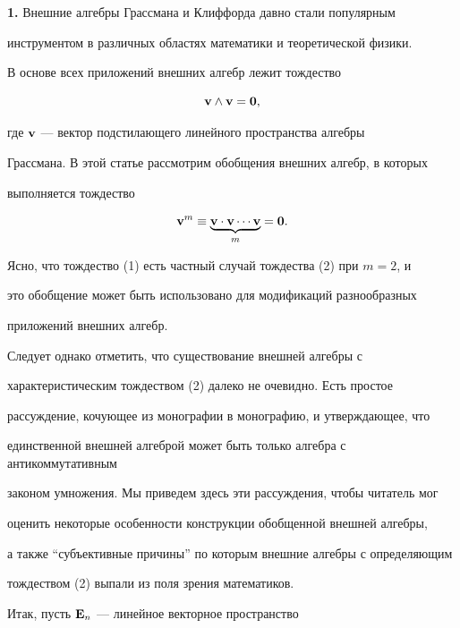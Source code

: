 {\bf 1.} Внешние алгебры Грассмана и Клиффорда давно стали  популярным


инструментом в различных областях математики и теоретической физики.


В основе всех приложений внешних алгебр лежит тождество


\begin{equation}


\bold v \land {\bold v} = {\bold 0},


\end{equation}


где ${\bold v}$ --- вектор подстилающего линейного пространства алгебры


Грассмана. В этой статье рассмотрим обобщения внешних алгебр, в которых


выполняется тождество


\begin{equation}


{\bold v}^m \equiv  \underbrace{ {\bold v \cdot\bold v \dotsb\bold v}}_{m}


= {\bold 0}.


\end{equation}


Ясно, что тождество (1) есть частный случай тождества (2) при $m=2$, и


это обобщение может быть использовано для модификаций разнообразных


приложений внешних алгебр.





Следует однако отметить, что существование внешней алгебры с


характеристическим тождеством (2) далеко не очевидно. Есть простое


рассуждение, кочующее из монографии в монографию, и утверждающее, что


единственной внешней алгеброй может быть только алгебра с антикоммутативным


законом умножения. Мы приведем здесь эти рассуждения, чтобы читатель мог


оценить некоторые особенности конструкции обобщенной внешней алгебры,


а также ``субъективные причины'' по которым внешние алгебры с определяющим


тождеством (2) выпали из поля зрения математиков.





Итак, пусть ${\bold E}_n$ --- линейное векторное пространство


